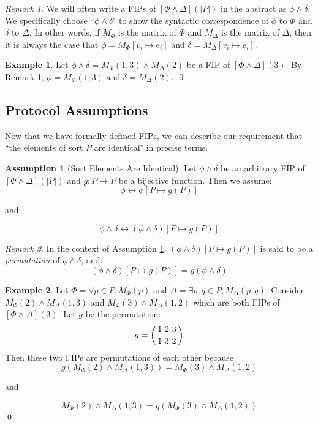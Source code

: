\documentclass[12pt]{article}
\theoremstyle{definition}
\newtheorem{assumption}{Assumption}
\newtheorem{example}{Example}
\theoremstyle{remark}
\newtheorem{remark}{Remark}
\newcommand{\msp}{\text{ }}
\newcommand{\perm}{\genfrac{}{}{0pt}{}}
\begin{document}
\begin{remark}
  \label{rmk:fip-syntax}
  We will often write a FIPs of $[\Phi\land\Delta](|P|)$ in the abstract as $\phi\land\delta$.  We specifically choose ``$\phi\land\delta$" to show the syntactic correspondence of $\phi$ to $\Phi$ and $\delta$ to $\Delta$.  In other words, if $M_{\Phi}$ is the matrix of $\Phi$ and $M_{\Delta}$ is the matrix of $\Delta$, then it is always the case that $\phi = M_{\Phi}[v_i \mapsto e_i]$ and $\delta = M_{\Delta}[v_i \mapsto e_i]$.
\end{remark}

\begin{example}
  Let $\phi\land\delta = M_{\Phi}(1,3) \land M_{\Delta}(2)$ be a FIP of $[\Phi\land\Delta](3)$.  By Remark \ref{rmk:fip-syntax}, $\phi = M_{\Phi}(1,3)$ and $\delta = M_{\Delta}(2)$.
  \qed
\end{example}


\subsection{Protocol Assumptions}

Now that we have formally defined FIPs, we can describe our requirement that ``the elements of sort $P$ are identical" in precise terms.

\begin{assumption}[Sort Elements Are Identical]
  \label{asmp:perm}
  Let $\phi\land\delta$ be an arbitrary FIP of $[\Phi\land\Delta](|P|)$ and $g : P \to P$ be a bijective function.  Then we assume:
  $$\phi \leftrightarrow \phi[P \mapsto g(P)]$$
  \begin{center}
    and
  \end{center}
  $$\phi\land\delta \leftrightarrow (\phi\land\delta)[P \mapsto g(P)]$$
\end{assumption}

\begin{remark}
  In the context of Assumption \ref{asmp:perm}, $(\phi\land\delta)[P \mapsto g(P)]$ is said to be a \textit{permutation} of $\phi\land\delta$, and:
  $$(\phi\land\delta)[P \mapsto g(P)] = g(\phi\land\delta)$$
\end{remark}

\begin{example}
  Let $\Phi = \forall p \in P, M_{\Phi}(p)$ and $\Delta = \exists p,q \in P, M_{\Delta}(p,q)$.  Consider $M_{\Phi}(2) \land M_{\Delta}(1,3)$ and $M_{\Phi}(3) \land M_{\Delta}(1,2)$ which are both FIPs of $[\Phi\land\Delta](3)$.  Let $g$ be the permutation:
  $$g = \left(\perm{1 \msp 2 \msp 3}{1 \msp 3 \msp 2}\right)$$
  Then these two FIPs are permutations of each other because
  $$g(M_{\Phi}(2) \land M_{\Delta}(1,3)) = M_{\Phi}(3) \land M_{\Delta}(1,2)$$
  \begin{center}
    and
  \end{center}
  $$M_{\Phi}(2) \land M_{\Delta}(1,3) = g(M_{\Phi}(3) \land M_{\Delta}(1,2))$$
  \qed
\end{example}
\end{document}
